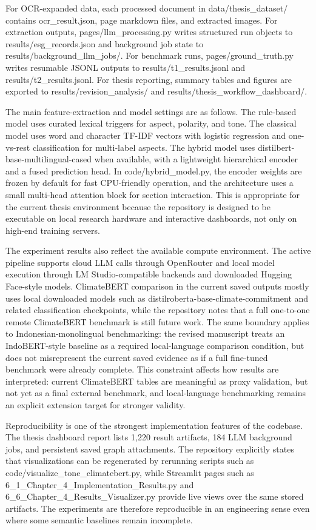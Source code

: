 \documentclass[english, online, cse, master]{dithesis}
\begin{document}
For OCR-expanded data, each processed document in data/thesis\_dataset/ contains ocr\_result.json, page markdown files, and extracted images. For extraction outputs, pages/llm\_processing.py writes structured run objects to results/esg\_records.json and background job state to results/background\_llm\_jobs/. For benchmark runs, pages/ground\_truth.py writes resumable JSONL outputs to results/t1\_results.jsonl and results/t2\_results.jsonl. For thesis reporting, summary tables and figures are exported to results/revision\_analysis/ and results/thesis\_workflow\_dashboard/.

The main feature-extraction and model settings are as follows. The rule-based model uses curated lexical triggers for aspect, polarity, and tone. The classical model uses word and character TF-IDF vectors with logistic regression and one-vs-rest classification for multi-label aspects. The hybrid model uses distilbert-base-multilingual-cased when available, with a lightweight hierarchical encoder and a fused prediction head. In code/hybrid\_model.py, the encoder weights are frozen by default for fast CPU-friendly operation, and the architecture uses a small multi-head attention block for section interaction. This is appropriate for the current thesis environment because the repository is designed to be executable on local research hardware and interactive dashboards, not only on high-end training servers.

The experiment results also reflect the available compute environment. The active pipeline supports cloud LLM calls through OpenRouter and local model execution through LM Studio-compatible backends and downloaded Hugging Face-style models. ClimateBERT comparison in the current saved outputs mostly uses local downloaded models such as distilroberta-base-climate-commitment and related classification checkpoints, while the repository notes that a full one-to-one remote ClimateBERT benchmark is still future work. The same boundary applies to Indonesian-monolingual benchmarking: the revised manuscript treats an IndoBERT-style baseline as a required local-language comparison condition, but does not misrepresent the current saved evidence as if a full fine-tuned benchmark were already complete. This constraint affects how results are interpreted: current ClimateBERT tables are meaningful as proxy validation, but not yet as a final external benchmark, and local-language benchmarking remains an explicit extension target for stronger validity.

Reproducibility is one of the strongest implementation features of the codebase. The thesis dashboard report lists 1,220 result artifacts, 184 LLM background jobs, and persistent saved graph attachments. The repository explicitly states that visualizations can be regenerated by rerunning scripts such as code/visualize\_tone\_climatebert.py, while Streamlit pages such as 6\_1\_Chapter\_4\_Implementation\_Results.py and 6\_6\_Chapter\_4\_Results\_Visualizer.py provide live views over the same stored artifacts. The experiments are therefore reproducible in an engineering sense even where some semantic baselines remain incomplete.
\end{document}
